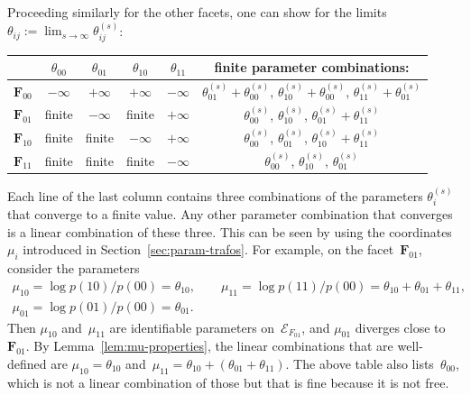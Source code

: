 \documentclass[aos,noinfoline]{imsart}
\newcommand{\Ecal}{\mathcal{E}}
\newcommand{\Fbf}{\mathbf{F}}
\theoremstyle{remark}
\theoremstyle{definition}
\begin{document}
  Proceeding similarly for the other facets, one can show for the limits
  $\theta_{ij}:=\lim_{s\to\infty}\theta_{ij}^{(s)}$:
  \begin{center}
    \begin{tabular}{lccccc}
      \toprule
      & $\theta_{00}$ & $\theta_{01}$ & $\theta_{10}$ & $\theta_{11}$ & finite parameter combinations:\\
      \midrule
      $\Fbf_{00}$ & $-\infty$ &  $+\infty$ &  $+\infty$ &  $-\infty$ & $\theta^{(s)}_{01}+\theta^{(s)}_{00}$, $\theta^{(s)}_{10}+\theta^{(s)}_{00}$, $\theta^{(s)}_{11}+\theta^{(s)}_{01}$ \\
      $\Fbf_{01}$ &   finite  &  $-\infty$ &    finite  &  $+\infty$ & $\theta^{(s)}_{00}$, $\theta^{(s)}_{10}$, $\theta^{(s)}_{01}+\theta^{(s)}_{11}$ \\
      $\Fbf_{10}$ &   finite  &    finite  &  $-\infty$ &  $+\infty$ & $\theta^{(s)}_{00}$, $\theta^{(s)}_{01}$, $\theta^{(s)}_{10}+\theta^{(s)}_{11}$ \\
      $\Fbf_{11}$ &   finite  &    finite  &    finite  &  $-\infty$ &  $\theta^{(s)}_{00}$, $\theta^{(s)}_{10}$, $\theta^{(s)}_{01}$ \\
      \bottomrule
    \end{tabular}
  \end{center}
  Each line of the last column contains three combinations of the parameters $\theta^{(s)}_{i}$ that converge to a finite value.
 Any other parameter combination that converges is a linear
  combination of these three.  This can be seen by using the coordinates $\mu_{i}$ introduced in
  Section~\ref{sec:param-trafos}.  For example, on the facet~$\Fbf_{01}$,
  consider the parameters
  \begin{gather*}
    \mu_{10} = \log p(10)/p(00) = \theta_{10}, \qquad
    \mu_{11} = \log p(11)/p(00) = \theta_{10}+\theta_{01}+\theta_{11}, \\
    \mu_{01} = \log p(01)/p(00) = \theta_{01}.
  \end{gather*}
  Then $\mu_{10}$ and~$\mu_{11}$ are identifiable parameters on~$\Ecal_{F_{01}}$, and $\mu_{01}$ diverges close
  to~$\Fbf_{01}$.  By Lemma~\ref{lem:mu-properties}, the linear combinations that are well-defined are $\mu_{10}=\theta_{10}$
  and~$\mu_{11}=\theta_{10}+(\theta_{01}+\theta_{11})$.  The above table also lists~$\theta_{00}$, which  is not a linear combination of those but that is fine because it is not  free.
\end{document}
